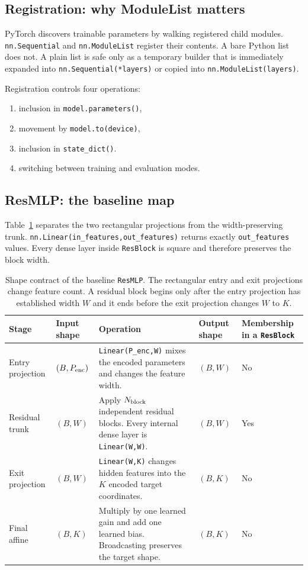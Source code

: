 \documentclass[10pt,aps,prd,twocolumn,nofootinbib]{revtex4-2}
\newcommand{\code}[1]{\texttt{#1}}
\begin{document}
\subsection{Registration: why ModuleList matters}

PyTorch discovers trainable parameters by walking registered child modules.
\code{nn.Sequential} and \code{nn.ModuleList} register their contents.  A bare
Python list does not.  A plain list is safe only as a temporary builder that
is immediately expanded into \code{nn.Sequential(*layers)} or copied into
\code{nn.ModuleList(layers)}.

Registration controls four operations:
\begin{enumerate}
  \item inclusion in \code{model.parameters()},
  \item movement by \code{model.to(device)},
  \item inclusion in \code{state\_dict()}.
  \item switching between training and evaluation modes.
\end{enumerate}

\subsection{ResMLP: the baseline map}

Table~\ref{tab:resmlp-shapes} separates the two rectangular projections from
the width-preserving trunk.  \code{nn.Linear(in\_features,out\_features)}
returns exactly \code{out\_features} values.  Every dense layer inside
\code{ResBlock} is square and therefore preserves the block width.

\begin{table}[t]
\centering
\begin{tabular}{p{}p{}p{}
                p{}p{}}
\toprule
Stage & Input shape & Operation & Output shape & Membership in a
\code{ResBlock} \\
\midrule
Entry projection & $(B,P_{\rm enc})$
  & \code{Linear(P\_enc,W)} mixes the encoded parameters and changes the
    feature width.
  & $(B,W)$ & No \\
Residual trunk & $(B,W)$
  & Apply $N_{\rm block}$ independent residual blocks.  Every internal dense
    layer is \code{Linear(W,W)}.
  & $(B,W)$ & Yes \\
Exit projection & $(B,W)$
  & \code{Linear(W,K)} changes hidden features into the $K$ encoded target
    coordinates.
  & $(B,K)$ & No \\
Final affine & $(B,K)$
  & Multiply by one learned gain and add one learned bias.  Broadcasting
    preserves the target shape.
  & $(B,K)$ & No \\
\bottomrule
\end{tabular}
\caption{Shape contract of the baseline \code{ResMLP}.  The rectangular entry
and exit projections change feature count.  A residual block begins only
after the entry projection has established width $W$ and it ends before the
exit projection changes $W$ to $K$.}
\label{tab:resmlp-shapes}
\end{table}
\end{document}
